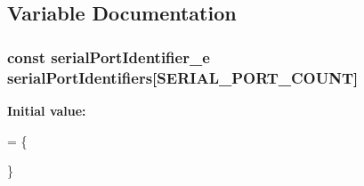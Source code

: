 \subsection{Variable Documentation}
\hypertarget{group__config_ga6604b8703c26d1030d6c12d78bcedfed}{
\subsubsection[{serial\+Port\+Identifiers}]{\setlength{\rightskip}{0pt plus 5cm}const {\bf serial\+Port\+Identifier\+\_\+e} serial\+Port\+Identifiers\mbox{[}{\bf S\+E\+R\+I\+A\+L\+\_\+\+P\+O\+R\+T\+\_\+\+C\+O\+U\+N\+T}\mbox{]}}}\label{group__config_ga6604b8703c26d1030d6c12d78bcedfed}
{\bfseries Initial value\+:}
\begin{DoxyCode}
= \{
























    \}
\end{DoxyCode}
